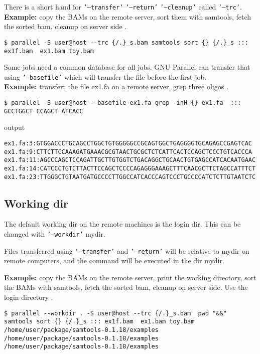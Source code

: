 \documentclass{article}
\newcommand{\example}[1]{
\textbf{Example: } {\color[rgb]{0,0,1} #1 } .
}
\newcommand{\cmdoption}[1]{\texttt{'#1'}}
\begin{document}
There is a short hand for \cmdoption{--transfer} \cmdoption{--return} \cmdoption{--cleanup} called \cmdoption{--trc}.\\
\example{copy the BAMs on the remote server, sort them with samtools, fetch the sorted bam, cleanup on server side}
\begin{lstlisting}
$ parallel -S user@host --trc {/.}_s.bam samtools sort {} {/.}_s ::: ex1f.bam  ex1.bam toy.bam
\end{lstlisting}


Some jobs need a common database for all jobs. GNU Parallel can transfer that using \cmdoption{--basefile} which will transfer the file before the first job.\\
\example{transfert the file  ex1.fa on a remote server, grep three oligos}
\begin{lstlisting}
$ parallel -S user@host --basefile ex1.fa grep -inH {} ex1.fa  :::  GCCTGGCT CCAGCT ATCACC
\end{lstlisting}
output
\begin{lstlisting}
ex1.fa:3:GTGGACCCTGCAGCCTGGCTGTGGGGGCCGCAGTGGCTGAGGGGTGCAGAGCCGAGTCAC
ex1.fa:9:CTTCTTCCAAAGATGAAACGCGTAACTGCGCTCTCATTCACTCCAGCTCCCTGTCACCCA
ex1.fa:11:AGCCCAGCTCCAGATTGCTTGTGGTCTGACAGGCTGCAACTGTGAGCCATCACAATGAAC
ex1.fa:14:CATCCCTGTCTTACTTCCAGCTCCCCAGAGGGAAAGCTTTCAACGCTTCTAGCCATTTCT
ex1.fa:23:TTGGGCTGTAATGATGCCCCTTGGCCATCACCCAGTCCCTGCCCCATCTCTTGTAATCTC
\end{lstlisting}
  


\subsection{Working dir}
The default working dir on the remote machines is the login dir. This can be changed with \cmdoption{--workdir} mydir.

Files transferred using \cmdoption{--transfer} and \cmdoption{--return} will be relative to mydir on remote computers, and the command will be executed in the dir mydir.



\example{copy the BAMs on the remote server, print the working directory, sort the BAMs with samtools, fetch the sorted bam, cleanup on server side. Use the login directory}
\begin{lstlisting}
$ parallel --workdir . -S user@host --trc {/.}_s.bam  pwd "&&" samtools sort {} {/.}_s ::: ex1f.bam  ex1.bam toy.bam
/home/user/package/samtools-0.1.18/examples
/home/user/package/samtools-0.1.18/examples
/home/user/package/samtools-0.1.18/examples
\end{lstlisting}
\end{document}

